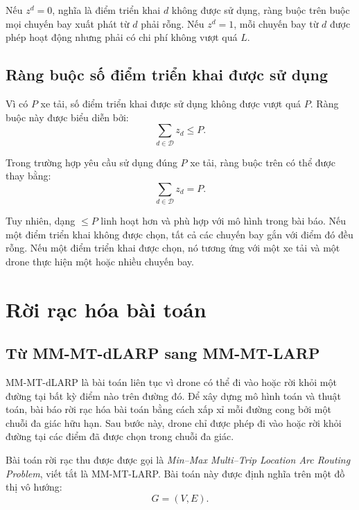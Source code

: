 Nếu \(z^d = 0\), nghĩa là điểm triển khai \(d\) không được sử dụng, ràng buộc trên buộc mọi chuyến bay xuất phát từ \(d\) phải rỗng. Nếu \(z^d = 1\), mỗi chuyến bay từ \(d\) được phép hoạt động nhưng phải có chi phí không vượt quá \(L\).

\subsection{Ràng buộc số điểm triển khai được sử dụng}

Vì có $P$ xe tải, số điểm triển khai được sử dụng không được vượt quá $P$. Ràng buộc này được biểu diễn bởi:
\begin{equation}
\sum_{d \in \mathcal{D}} z_d \leq P.
\end{equation}

Trong trường hợp yêu cầu sử dụng đúng $P$ xe tải, ràng buộc trên có thể được thay bằng:
\begin{equation}
\sum_{d \in \mathcal{D}} z_d = P.
\end{equation}

Tuy nhiên, dạng $\leq P$ linh hoạt hơn và phù hợp với mô hình trong bài báo. Nếu một điểm triển khai không được chọn, tất cả các chuyến bay gắn với điểm đó đều rỗng. Nếu một điểm triển khai được chọn, nó tương ứng với một xe tải và một drone thực hiện một hoặc nhiều chuyến bay.

\section{Rời rạc hóa bài toán}

\subsection{Từ MM-MT-dLARP sang MM-MT-LARP}

MM-MT-dLARP là bài toán liên tục vì drone có thể đi vào hoặc rời khỏi một đường tại bất kỳ điểm nào trên đường đó. Để xây dựng mô hình toán và thuật toán, bài báo rời rạc hóa bài toán bằng cách xấp xỉ mỗi đường cong bởi một chuỗi đa giác hữu hạn. Sau bước này, drone chỉ được phép đi vào hoặc rời khỏi đường tại các điểm đã được chọn trong chuỗi đa giác.

Bài toán rời rạc thu được được gọi là \textit{Min--Max Multi--Trip Location Arc Routing Problem}, viết tắt là MM-MT-LARP. Bài toán này được định nghĩa trên một đồ thị vô hướng:
\begin{equation}
G = (V, E).
\end{equation}

